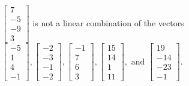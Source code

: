 \begin{exercise}
\begin{exerciseStatement}
  \end{exerciseStatement}
  \begin{exerciseAnswer}
   \(\left[\begin{array}{c}
7 \\
-5 \\
-9 \\
3
\end{array}\right]\) 
  	 is not  
	a linear combination of the vectors \(\left[\begin{array}{c}
-5 \\
1 \\
4 \\
-1
\end{array}\right] , \left[\begin{array}{c}
-2 \\
-3 \\
-1 \\
-2
\end{array}\right] , \left[\begin{array}{c}
-1 \\
7 \\
6 \\
3
\end{array}\right] , \left[\begin{array}{c}
15 \\
14 \\
1 \\
11
\end{array}\right] , \text{ and } \left[\begin{array}{c}
19 \\
-14 \\
-23 \\
-1
\end{array}\right]\).

	
  


  \end{exerciseAnswer}
\end{exercise}